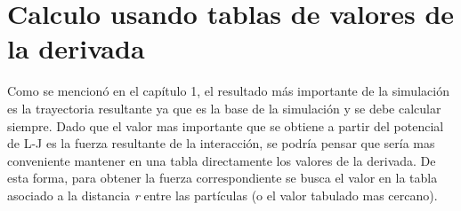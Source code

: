 \section{Calculo usando tablas de valores de la derivada}

Como se mencionó en el capítulo 1, el resultado más importante de la simulación es la trayectoria resultante ya que es la base de la simulación y se debe calcular siempre.
Dado que el valor mas importante que se obtiene a partir del potencial de L-J es la fuerza resultante de la interacción, se podría pensar que sería mas conveniente mantener en una tabla directamente los valores de la derivada. 
De esta forma, para obtener la fuerza correspondiente se busca el valor en la tabla asociado a la distancia \textit{r} entre las partículas (o el valor tabulado mas cercano). 

